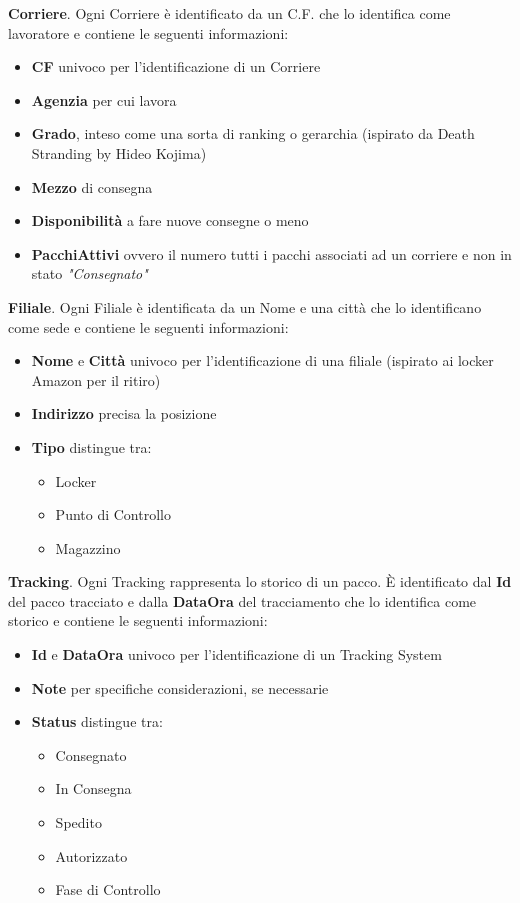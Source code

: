 \textbf{Corriere}. Ogni Corriere è identificato da un C.F. che lo identifica come lavoratore e contiene le seguenti informazioni:
\begin{itemize}
    \setlength{\itemindent}{+.5in}
    \item \textbf{CF} univoco per l'identificazione di un Corriere
    \item \textbf{Agenzia} per cui lavora
    \item \textbf{Grado}, inteso come una sorta di ranking o gerarchia \footnotesize{(ispirato da Death Stranding by  Hideo Kojima)}
    \item \normalsize{\textbf{Mezzo}} di consegna 
    \item \normalsize{\textbf{Disponibilità}} a fare nuove consegne o meno
    \item \textbf{PacchiAttivi} ovvero il numero tutti i pacchi associati ad un corriere e non in stato \textit{"Consegnato"}
\end{itemize}


\textbf{Filiale}. Ogni Filiale è identificata da un Nome e una città che lo identificano come sede e contiene le seguenti informazioni:
\begin{itemize}
    \setlength{\itemindent}{+.5in}
    \item \textbf{Nome} e \textbf{Città} univoco per l'identificazione di una filiale \footnotesize{(ispirato ai locker Amazon per il ritiro)}
    \item \textbf{Indirizzo} precisa la posizione
    \item \textbf{Tipo} distingue tra:
     \begin{itemize}
            \setlength{\itemindent}{+.5in}
            \item Locker
            \item Punto di Controllo
            \item Magazzino
        \end{itemize}
\end{itemize}

\textbf{Tracking}. Ogni Tracking rappresenta lo storico di un pacco. È identificato dal \textbf{Id} del pacco tracciato e dalla \textbf{DataOra} del tracciamento che lo identifica come storico e contiene le seguenti informazioni:
\begin{itemize}
    \setlength{\itemindent}{+.5in}
    \item \textbf{Id} e \textbf{DataOra} univoco per l'identificazione di un Tracking System
    \item \textbf{Note} per specifiche considerazioni, se necessarie
    \item \textbf{Status} distingue tra:
     \begin{itemize}
            \setlength{\itemindent}{+.5in}
            \item Consegnato
            \item In Consegna
            \item Spedito
            \item Autorizzato
            \item Fase di Controllo
        \end{itemize}
\end{itemize}



